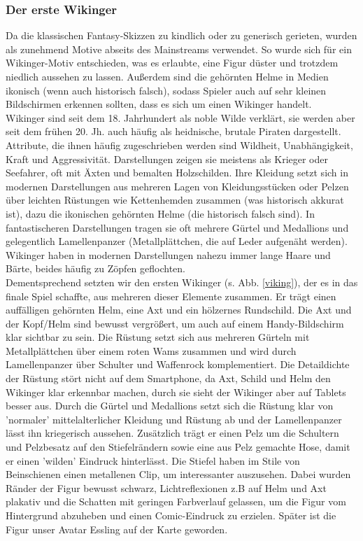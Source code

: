 \documentclass[extern,palatino]{cgBA}
\begin{document}
\subsubsection{Der erste Wikinger}
Da die klassischen Fantasy-Skizzen zu kindlich oder zu generisch gerieten, wurden als zunehmend Motive abseits des Mainstreams verwendet. So wurde sich für ein Wikinger-Motiv entschieden, was es erlaubte, eine Figur düster und trotzdem niedlich aussehen zu lassen. Außerdem sind die gehörnten Helme in Medien ikonisch (wenn auch historisch falsch\cite{helm}), sodass Spieler auch auf sehr kleinen Bildschirmen erkennen sollten, dass es sich um einen Wikinger handelt.
\\Wikinger sind seit dem 18. Jahrhundert als noble Wilde verklärt, sie werden aber seit dem frühen 20. Jh. auch häufig als heidnische, brutale Piraten\cite{viki} dargestellt.%
Attribute, die ihnen häufig zugeschrieben werden sind Wildheit, Unabhängigkeit, Kraft und Aggressivität. Darstellungen zeigen sie meistens als Krieger oder Seefahrer, oft mit Äxten und bemalten Holzschilden. Ihre Kleidung setzt sich in modernen Darstellungen aus mehreren Lagen von Kleidungsstücken oder Pelzen über leichten Rüstungen wie Kettenhemden zusammen (was historisch akkurat ist), dazu die ikonischen gehörnten Helme (die historisch falsch sind). In fantastischeren Darstellungen tragen sie oft mehrere Gürtel und Medallions und gelegentlich Lamellenpanzer (Metallplättchen, die auf Leder aufgenäht werden). Wikinger haben in modernen Darstellungen nahezu immer lange Haare und Bärte, beides häufig zu Zöpfen geflochten. 
\\Dementsprechend setzten wir den ersten Wikinger (s. Abb. \ref{viking}), der es in das finale Spiel schaffte, aus mehreren dieser Elemente zusammen. Er trägt einen auffälligen gehörnten Helm, eine Axt und ein hölzernes Rundschild. Die Axt und der Kopf/Helm sind bewusst vergrößert, um auch auf einem Handy-Bildschirm klar sichtbar zu sein. Die Rüstung setzt sich aus mehreren Gürteln mit Metallplättchen über einem roten Wams zusammen und wird durch Lamellenpanzer über Schulter und Waffenrock komplementiert. Die Detaildichte der Rüstung stört nicht auf dem Smartphone, da Axt, Schild und Helm den Wikinger klar erkennbar machen, durch sie sieht der Wikinger aber auf Tablets besser aus. Durch die Gürtel und Medallions setzt sich die Rüstung klar von 'normaler' mittelalterlicher Kleidung und Rüstung ab und der Lamellenpanzer lässt ihn kriegerisch aussehen. Zusätzlich trägt er einen Pelz um die Schultern und Pelzbesatz auf den Stiefelrändern sowie eine aus Pelz gemachte Hose, damit er einen 'wilden' Eindruck hinterlässt. Die Stiefel haben im Stile von Beinschienen einen metallenen Clip, um interessanter auszusehen. Dabei wurden Ränder der Figur bewusst schwarz, Lichtreflexionen z.B auf Helm und Axt plakativ und die Schatten mit geringen Farbverlauf gelassen, um die Figur vom Hintergrund abzuheben und einen Comic-Eindruck zu erzielen. Später ist die Figur unser Avatar Essling auf der Karte geworden.
	
\end{document}

